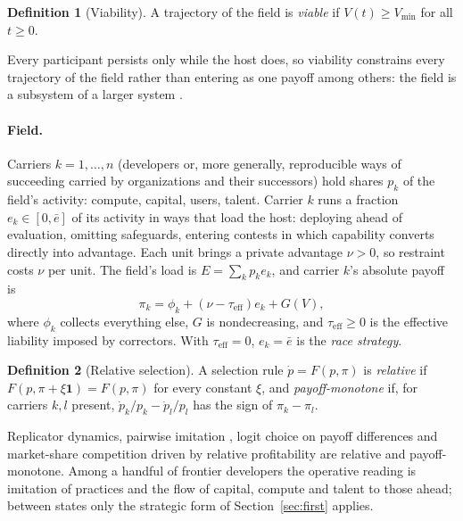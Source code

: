 \documentclass[letterpaper]{article} %
\theoremstyle{definition}
\newtheorem{definition}{Definition}
\newcommand{\Vmin}{V_{\min}}
\newcommand{\taueff}{\tau_{\mathrm{eff}}}
\begin{document}
\begin{definition}[Viability]\label{def:viable}
A trajectory of the field is \emph{viable} if $V(t)\ge\Vmin$ for all $t\ge0$.
\end{definition}

Every participant persists only while the host does, so viability constrains every trajectory of the field rather than entering as one payoff among others: the field is a subsystem of a larger system \citep{aubin1991,rockstrom2009,wced1987}.

\paragraph{Field.} Carriers $k=1,\dots,n$ (developers or, more generally, reproducible ways of succeeding carried by organizations and their successors) hold shares $p_k$ of the field's activity: compute, capital, users, talent. Carrier $k$ runs a fraction $e_k\in[0,\bar e]$ of its activity in ways that load the host: deploying ahead of evaluation, omitting safeguards, entering contests in which capability converts directly into advantage. Each unit brings a private advantage $\nu>0$, so restraint costs $\nu$ per unit. The field's load is $E=\sum_kp_ke_k$, and carrier $k$'s absolute payoff is
\begin{equation}\label{eq:pi}
\pi_k=\phi_k+(\nu-\taueff)e_k+G(V),
\end{equation}
where $\phi_k$ collects everything else, $G$ is nondecreasing, and $\taueff\ge0$ is the effective liability imposed by correctors. With $\taueff=0$, $e_k=\bar e$ is the \emph{race strategy}.

\begin{definition}[Relative selection]\label{def:relsel}
A selection rule $\dot p=F(p,\pi)$ is \emph{relative} if $F(p,\pi+\xi\mathbf 1)=F(p,\pi)$ for every constant $\xi$, and \emph{payoff-monotone} if, for carriers $k,l$ present, $\dot p_k/p_k-\dot p_l/p_l$ has the sign of $\pi_k-\pi_l$.
\end{definition}

Replicator dynamics, pairwise imitation \citep{schlag1998}, logit choice on payoff differences and market-share competition driven by relative profitability \citep{alchian1950} are relative and payoff-monotone. Among a handful of frontier developers the operative reading is imitation of practices and the flow of capital, compute and talent to those ahead; between states only the strategic form of Section~\ref{sec:first} applies.
\end{document}
